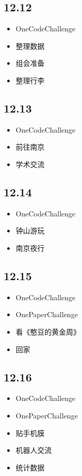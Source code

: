 \documentclass[UTF8]{ctexart}
\begin{document}
\subsection*{12.12}
\begin{itemize}
    \item OneCodeChallenge
    \item 整理数据
    \item 组会准备
    \item 整理行李
\end{itemize}

\subsection*{12.13}
\begin{itemize}
    \item OneCodeChallenge
    \item 前往南京
    \item 学术交流
\end{itemize}

\subsection*{12.14}
\begin{itemize}
    \item OneCodeChallenge
    \item 钟山游玩
    \item 南京夜行
\end{itemize}

\subsection*{12.15}
\begin{itemize}
    \item OneCodeChallenge
    \item OnePaperChallenge
    \item 看《憨豆的黄金周》
    \item 回家
\end{itemize}

\subsection*{12.16}
\begin{itemize}
    \item OneCodeChallenge
    \item OnePaperChallenge
    \item 贴手机膜
    \item 机器人交流
    \item 统计数据
\end{itemize}
\end{document}
